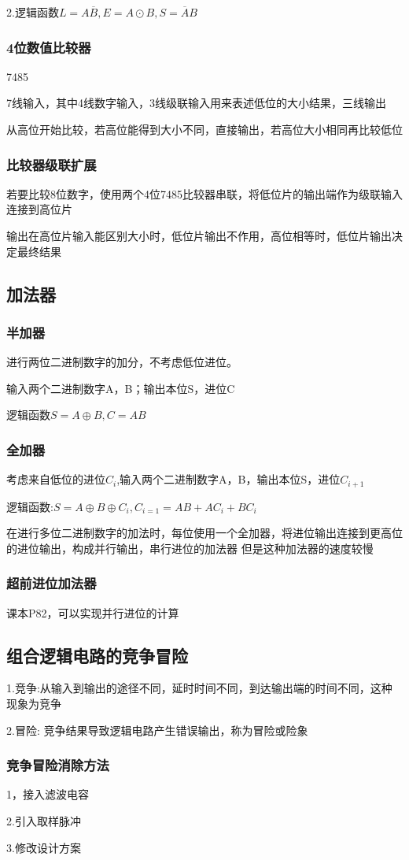 \documentclass[11pt,twoside,a4paper]{ctexart}
\begin{document}
    2.逻辑函数$L = A\overline{B},E = A\odot B,S = \overline{A}B $
    
    \subsubsection{4位数值比较器}

    7485

    7线输入，其中4线数字输入，3线级联输入用来表述低位的大小结果，三线输出

    从高位开始比较，若高位能得到大小不同，直接输出，若高位大小相同再比较低位

    \subsubsection{比较器级联扩展}

    若要比较8位数字，使用两个4位7485比较器串联，将低位片的输出端作为级联输入连接到高位片

    输出在高位片输入能区别大小时，低位片输出不作用，高位相等时，低位片输出决定最终结果

    \subsection{加法器}

    \subsubsection{半加器}

    进行两位二进制数字的加分，不考虑低位进位。

    输入两个二进制数字A，B；输出本位S，进位C

    逻辑函数$S = A\oplus B,C = AB$

    \subsubsection{全加器}

    考虑来自低位的进位$C_i$,输入两个二进制数字A，B，输出本位S，进位$C_{i+1}$

    逻辑函数:$S = A\oplus B\oplus C_i,C_{i=1} = AB + AC_i + BC_i$

    在进行多位二进制数字的加法时，每位使用一个全加器，将进位输出连接到更高位的进位输出，构成并行输出，串行进位的加法器
    但是这种加法器的速度较慢

    \subsubsection{超前进位加法器}
    课本P82，可以实现并行进位的计算

    \subsection{组合逻辑电路的竞争冒险}

    1.竞争:从输入到输出的途径不同，延时时间不同，到达输出端的时间不同，这种现象为竞争

    2.冒险: 竞争结果导致逻辑电路产生错误输出，称为冒险或险象

    \subsubsection{竞争冒险消除方法}

    1，接入滤波电容

    2.引入取样脉冲

    3.修改设计方案



    
\end{document}
